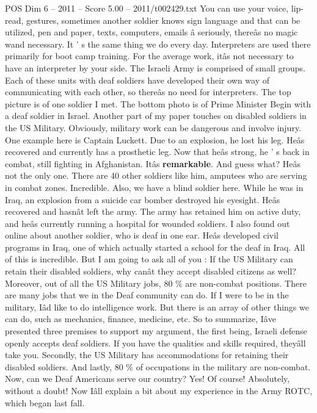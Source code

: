 \begin{textsample}{POS Dim 6 – 2011 – Score 5.00 – 2011/t002429.txt}
You can use your voice, lip-read, gestures, sometimes another soldier knows sign language and that can be utilized, pen and paper, texts, computers, emails â seriously, thereâs no magic wand necessary.
It ' s the same thing we do every day.
Interpreters are used there primarily for boot camp training.
For the average work, itâs not necessary to have an interpreter by your side.
The Israeli Army is comprised of small groups.
Each of these units with deaf soldiers have developed their own way of communicating with each other, so thereâs no need for interpreters.
The top picture is of one soldier I met.
The bottom photo is of Prime Minister Begin with a deaf soldier in Israel.
Another part of my paper touches on disabled soldiers in the US Military.
Obviously, military work can be dangerous and involve injury.
One example here is Captain Luckett.
Due to an explosion, he lost his leg.
Heâs recovered and currently has a prosthetic leg.
Now that heâs strong, he ' s back in combat, still fighting in Afghanistan.
Itâs \textbf{remarkable}.
And guess what?
Heâs not the only one.
There are 40 other soldiers like him, amputees who are serving in combat zones.
Incredible.
Also, we have a blind soldier here.
While he was in Iraq, an explosion from a suicide car bomber destroyed his eyesight.
Heâs recovered and hasnât left the army.
The army has retained him on active duty, and heâs currently running a hospital for wounded soldiers.
I also found out online about another soldier, who is deaf in one ear.
Heâs developed civil programs in Iraq, one of which actually started a school for the deaf in Iraq.
All of this is incredible.
But I am going to ask all of you : If the US Military can retain their disabled soldiers, why canât they accept disabled citizens as well?
Moreover, out of all the US Military jobs, 80 \% are non-combat positions.
There are many jobs that we in the Deaf community can do.
If I were to be in the military, Iâd like to do intelligence work.
But there is an array of other things we can do, such as mechanics, finance, medicine, etc.
So to summarize, Iâve presented three premises to support my argument, the first being, Israeli defense openly accepts deaf soldiers.
If you have the qualities and skills required, theyâll take you.
Secondly, the US Military has accommodations for retaining their disabled soldiers.
And lastly, 80 \% of occupations in the military are non-combat.
Now, can we Deaf Americans serve our country?
Yes!
Of course!
Absolutely, without a doubt!
Now Iâll explain a bit about my experience in the Army ROTC, which began last fall.

\end{textsample}
